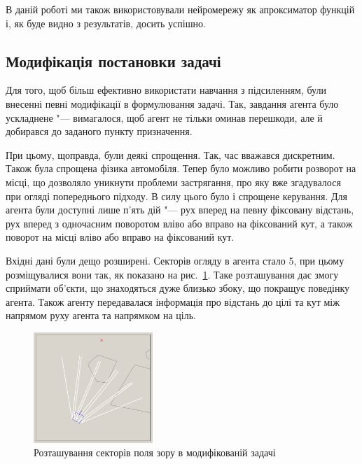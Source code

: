 \documentclass[a4paper,10pt,fleqn]{article}
\begin{document}
В даній роботі ми також використовували нейромережу як апроксиматор функцій і, як буде видно з результатів, досить успішно.

\subsection{Модифікація постановки задачі}

Для того, щоб більш ефективно використати навчання з підсиленням, були внесенні певні модифікації в формулювання задачі. Так, завдання агента було ускладнене "--- вимагалося, щоб агент не тільки оминав перешкоди, але й добирався до заданого пункту призначення.

При цьому, щоправда, були деякі спрощення. Так, час вважався дискретним. Також була спрощена фізика автомобіля. Тепер було можливо робити розворот на місці, що дозволяло уникнути проблеми застрягання, про яку вже згадувалося при огляді попереднього підходу. В силу цього було і спрощене керування. Для агента були доступні лише п'ять дій "--- рух вперед на певну фіксовану відстань, рух вперед з одночасним поворотом вліво або вправо на фіксований кут, а також поворот на місці вліво або вправо на фіксований кут. 

Вхідні дані були дещо розширені. Секторів огляду в агента стало 5, при цьому розміщувалися вони так, як показано на рис.~\ref{fig:tank-vis-area}. Таке розташування дає змогу сприймати об'єкти, що знаходяться дуже близько збоку, що покращує поведінку агента. Також агенту передавалася інформація про відстань до цілі та кут між напрямом руху агента та напрямком на ціль.
\begin{figure}
	\centering
	\includegraphics[width=0.4\textwidth]{tank-vis-area}
	\caption{Розташування секторів поля зору в модифікованій задачі}
	\label{fig:tank-vis-area}
\end{figure}
\end{document}
